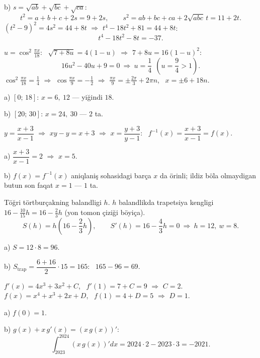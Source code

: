 b) $s=\sqrt{ab}+\sqrt{bc}+\sqrt{ca}$:
\[t^2=a+b+c+2s=9+2s,\qquad s^2=ab+bc+ca+2\sqrt{abc}\,t=11+2t.\]
$\left(t^2-9\right)^2=4s^2=44+8t$ $\Rightarrow$ $t^4-18t^2+81=44+8t$:
\[t^4-18t^2-8t=-37.\]

\newpage
{}
$u=\cos^2\frac{\pi x}{18}$: \ $\sqrt{7+8u}=4(1-u)$ $\Rightarrow$ $7+8u=16(1-u)^2$:
\[16u^2-40u+9=0\ \Rightarrow\ u=\frac14\ \ \left(u=\frac94>1\right).\]
$\cos^2\frac{\pi x}{18}=\frac14$ $\Rightarrow$ $\cos\frac{\pi x}9=-\frac12$ $\Rightarrow$ $\frac{\pi x}9=\pm\frac{2\pi}3+2\pi n$, \ $x=\pm6+18n$.

a) $[0;\,18]$: $x=6,\ 12$ — yiğindi $18$.

b) $[20;\,30]$: $x=24,\ 30$ — $2$ ta.

\newpage
{}
$y=\dfrac{x+3}{x-1}$ $\Rightarrow$ $xy-y=x+3$ $\Rightarrow$ $x=\dfrac{y+3}{y-1}$: \ $f^{-1}(x)=\dfrac{x+3}{x-1}=f(x)$.

a) $\dfrac{x+3}{x-1}=2$ $\Rightarrow$ $x=5$.

b) $f(x)=f^{-1}(x)$ aniqlaniş sohasidagi barça $x$ da örinli; ildiz böla olmaydigan butun son faqat $x=1$ — $1$ ta.

\newpage
{}
Töğri törtburçakning balandligi $h$. $h$ balandlikda trapetsiya kengligi $16-\frac{10}{15}h=16-\frac23h$ (yon tomon çiziği böyiça).
\[S(h)=h\left(16-\frac23h\right),\qquad S'(h)=16-\frac43h=0\ \Rightarrow\ h=12,\ w=8.\]

a) $S=12\cdot8=96$.

b) $S_{\text{trap}}=\dfrac{6+16}2\cdot15=165$: \ $165-96=69$.

\newpage
{}
$f'(x)=4x^3+3x^2+C$, \ $f'(1)=7+C=9$ $\Rightarrow$ $C=2$.\\
$f(x)=x^4+x^3+2x+D$, \ $f(1)=4+D=5$ $\Rightarrow$ $D=1$.

a) $f(0)=1$.

b) $g(x)+x\,g'(x)=\left(x\,g(x)\right)'$:
\[\int_{2023}^{2024}\left(x\,g(x)\right)'dx=2024\cdot2-2023\cdot3=-2021.\]

